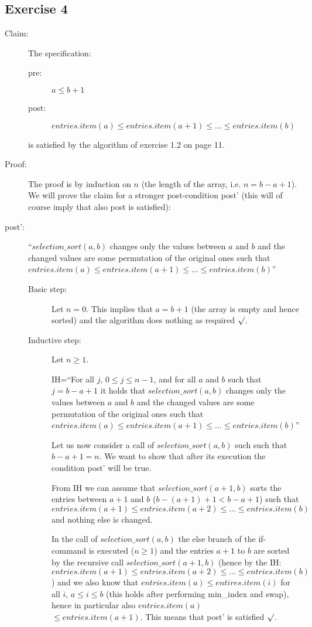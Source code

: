 \documentclass[english]{article}
\begin{document}
\subsection*{Exercise 4}
\begin{description}
  \item[Claim:] The specification:
    \begin{description}
      \item[pre:] $a \leq b+1$
	  \item[post:] $entries.item(a) \leq entries.item(a+1)\leq \ldots \leq entries.item(b)$
    \end{description}
    is satisfied by the algorithm of exercise 1.2 on page 11.
  \item[Proof:] The proof is by induction on $n$ (the length of the array,
 i.e. $n=b-a+1$).
We will prove the claim for a stronger post-condition
post' (this will of course imply that also post is satisfied):

  \item[post':] ``$selection\_sort(a,b)$ changes only the
values between $a$ and $b$ and the changed values are some permutation
of the original ones such that
 $entries.item(a) \leq entries.item(a+1)\leq \ldots \leq entries.item(b)$''
  \begin{description}
  \item[Basic step:] Let $n=0$.
 This implies that $a=b+1$ (the array is empty and hence sorted)
  and the algorithm does nothing as required $\surd$.
	\item[Inductive step:] Let $n \geq 1$. 

IH=``For all $j$, $0 \leq j \leq n-1$, and for all $a$ and $b$ such that
$j=b-a+1$ it holds that
$selection\_sort(a,b)$ changes only the
values between $a$ and $b$ and the changed values are some permutation
of the original ones such that
 $entries.item(a) \leq entries.item(a+1)\leq \ldots \leq entries.item(b)$''

Let us now consider a call of $selection\_sort(a,b)$ such 
such that $b-a+1 = n$. We want to show that after its execution
the condition post' will be true.

From IH we can assume that $selection\_sort(a+1,b)$ sorts the entries 
between $a+1$ and $b$ ($b - (a+1) +1 < b - a +1$) such that
$entries.item(a+1) \leq entries.item(a+2)\leq \ldots \leq entries.item(b)$ and nothing else is changed.

In the call of $selection\_sort(a,b)$ 
the else branch of the if-command is
executed ($n\geq 1$) and
the entries $a+1$ to $b$ are sorted by the recursive call
$selection\_sort(a+1,b)$ (hence by the IH: $entries.item(a+1) \leq entries.item(a+2)\leq \ldots \leq entries.item(b)$)
and we also know that 
$entries.item(a) \leq entires.item(i)$ for all $i$, $a \leq i \leq b$
(this holds after performing min\_index and swap), hence in particular
also $entries.item(a)$\\$ \leq entries.item(a+1)$. This means that post'
is satisfied  $\surd$.
\end{description}
\end{description}
\end{document}
